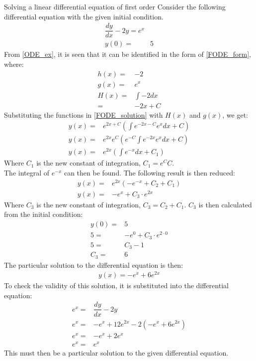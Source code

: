 \begin{example}{Solving a linear differential equation of first order}{}
Consider the following differential equation with the given initial condition.
\begin{align}
	\dfrac{dy}{dx}-2y=e^x  \label{ODE_ex}\\ 
	y(0) =& 5 \nonumber
\end{align}
From \eqref{ODE_ex}, it is seen that it can be identified in the form of \eqref{FODE_form}, where:
\begin{align*}
	h(x) =& -2 \\
	g(x) =& e^x \\
	H(x) =& \int{-2 dx} \\
	     =& -2x + C
\end{align*}
Substituting the functions in \eqref{FODE_solution} with $H(x)$ and $g(x)$, we get: 
\begin{align*}
	y(x)=&e^{2x+C}(\int{e^{-2x-C}e^x dx}+C) \\
	y(x)=&e^{2x}e^{C}(e^{-C}\int{e^{-2x}e^{x} dx}+C) \\
	y(x)=&e^{2x}(\int{e^{-x} dx}+C_{1})
\end{align*}
Where $C_{1}$ is the new constant of integration, $C_1=e^{C}C$. \\
The integral of $e^{-x}$ can then be found. The following result is then reduced:
\begin{align*}
	y(x)=&e^{2x}(-e^{-x}+C_{2}+C_{1}) \\
	y(x)=&-e^x+C_{3} \cdot e^{2x}
\end{align*}
Where $C_{3}$ is the new constant of integration, $C_{3}=C_{2}+C_{1}$. $C_{3}$ is then calculated from the initial condition:
\begin{align*}
	y(0)=&5 \\
	5=&-e^0+C_{3} \cdot e^{2 \cdot 0} \\
	5 =& C_{3}-1 \\
	C_{3} =& 6
\end{align*}
The particular solution to the differential equation is then:
\begin{align*}
	y(x) = -e^x+6e^{2x}
\end{align*}
To check the validity of this solution, it is substituted into the differential equation:
\begin{align*}
	e^x =& \dfrac{dy}{dx} -2y \\
	e^x =& -e^x+12e^{2x} -2(-e^x+6e^{2x})  \\
	e^x =& -e^x+2e^x  \\
	e^x =& e^x
\end{align*}
This must then be a particular solution to the given differential equation.
\end{example}

